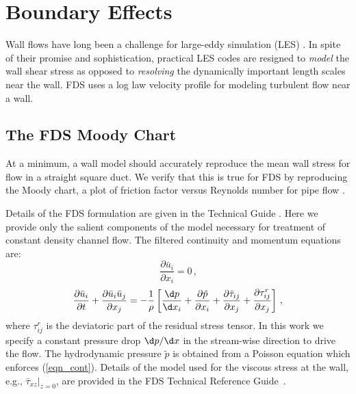 \documentclass[11pt]{book}
\begin{document}
\chapter{Boundary Effects}

Wall flows have long been a challenge for large-eddy simulation (LES) \cite{Baggett:1997,Baggett:1998,Cabot:1995,Pope:2000,Sagaut:2001}.  In spite of their promise and sophistication, practical LES codes are resigned to \emph{model} the wall shear stress as opposed to \emph{resolving} the dynamically important length scales near the wall. FDS uses a log law velocity profile \cite{Pope:2000} for modeling turbulent flow near a wall.

\section{The FDS Moody Chart}
\label{fds_moody_chart}

At a minimum, a wall model should accurately reproduce the mean wall stress for flow in a straight square duct.  We verify that this is true for FDS by reproducing the Moody chart, a plot of friction factor versus Reynolds number for pipe flow \cite{Moody:1944}.

Details of the FDS formulation are given in the Technical Guide \cite{FDS_Math_Guide}.  Here we provide only the salient components of the model necessary for treatment of constant density channel flow. The filtered continuity and momentum equations are:
\begin{equation}
\label{eqn_cont}
\frac{\partial \bar{u}_i}{\partial x_i} = 0 \,\mbox{,}
\end{equation}
\begin{equation}
\label{eqn_mom1}
\frac{\partial \bar{u}_i}{\partial t} + \frac{\partial \bar{u}_i \bar{u}_j}{\partial x_j} = -\frac{1}{\rho} \left[ \frac{\d p}{\d x_i} + \frac{\partial \tilde{p}}{\partial x_i} + \frac{\partial \bar{\tau}_{ij}}{\partial x_j} + \frac{\partial \tau_{ij}^{r}}{\partial x_j} \right]\,\mbox{,}
\end{equation}
where $\tau_{ij}^{r}$ is the deviatoric part of the residual stress tensor.  In this work we specify a constant pressure drop $\d p/\d x$ in the stream-wise direction to drive the flow.  The hydrodynamic pressure $\tilde{p}$ is obtained from a Poisson equation which enforces (\ref{eqn_cont}). Details of the model used for the viscous stress at the wall, e.g., $\bar{\tau}_{xz}|_{z=0}$, are provided in the FDS Technical Reference Guide~\cite{FDS_Tech_Guide}.
\end{document}
